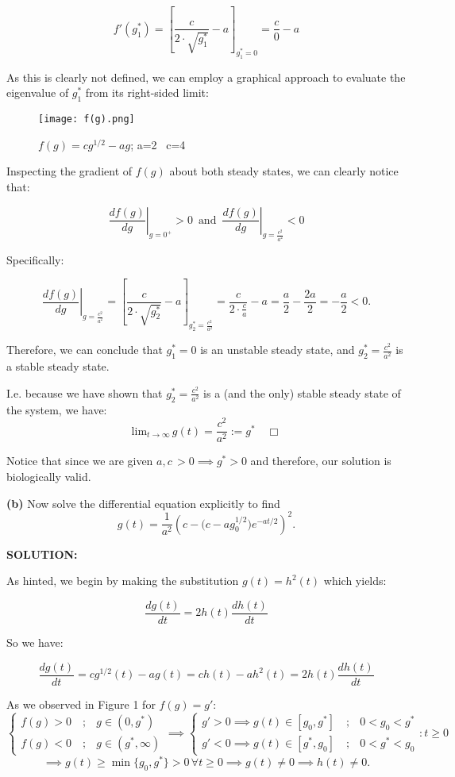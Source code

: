 \documentclass[]{article}
\begin{document}
\[
f'(g^*_1) = \left[{\frac{c}{2\cdot \sqrt{g^*_1}} - a}\right]_{g^*_1 = 0} = \frac{c}{0} - a
\]

As this is clearly not defined, we can employ a graphical approach to evaluate \indent the eigenvalue of $g^*_1$ from its right-sided limit:

\begin{figure}[H]
    \centering
    \texttt{[image: f(g).png]}
    \caption{$f(g) =c g^{1/2} - a g  $; a=2 \, c=4}
    \label{fig:f(g)}
\end{figure}
Inspecting the gradient of $f(g)$ about both steady states, we can clearly \indent notice that:

\[
\left. \frac{df(g)}{dg} \right|_{g=0^{+}} > 0 \, \text{ and } \, \left. \frac{df(g)}{dg} \right|_{g=\frac{c^2}{a^2}} < 0
\]

Specifically:

\[
\left. \frac{df(g)}{dg} \right|_{g=\frac{c^2}{a^2}} = \left[{\frac{c}{2\cdot \sqrt{g^*_2}} - a}\right]_{g^*_2 = \frac{c^2}{a^2}} = \frac{c}{2 \cdot \frac{c}{a} } - a = \frac{a}{2} -\frac{2a}{2} = - \frac{a}{2}  < 0.
\]

Therefore, we can conclude that $g^*_1 = 0$ is an unstable steady state, and \indent $g^*_2 = \frac{c^2}{a^2}$ is a stable steady state.\newline

I.e. because we have shown that $g^*_2 = \frac{c^2}{a^2}$ is a (and the only) stable steady \indent state of the system, we have:
\[
\text{lim}_{t\to \infty}\, g(t) = \frac{c^2}{a^2} := g^* \quad \Box
\]

Notice that since we are given $a, c \, > 0 \implies g^* > 0$ and therefore, our \indent solution is biologically valid. \newline

\noindent \textbf{(b)} Now solve the differential equation explicitly to find
\[
g(t) = \frac{1}{a^2} \left( c - \big(c - a g_0^{1/2}\big) e^{-at/2} \right)^2.
\]

\noindent \textbf{SOLUTION:}\newline

As hinted, we begin by making the substitution $g(t) = h^2(t)$ which yields:

\[
\frac{dg(t)}{dt} = 2h(t)\frac{dh(t)}{dt}
\]

So we have:

\[
\frac{dg(t)}{dt} =  c g^{1/2}(t) - a g(t) = c h(t) -ah^2(t) = 2h(t)\frac{dh(t)}{dt}
\]

As we observed in Figure 1 for $f(g) = g'$:
\[
\begin{cases}
    f(g) > 0 \quad ;&g\in(0,g^*)\\
    f(g) < 0  \quad ;& g \in (g^*,\infty)
\end{cases} \implies  \begin{cases}
    g' > 0 \implies g(t) \in [g_0,g^*] \quad ;& 0<g_0 < g^* \\
    g ' < 0 \implies g(t) \in [g^* , g_0] \quad ;& 0<g^*<g_0
\end{cases}: t\geq 0 \]
\[\implies g(t) \geq \min\{g_0,g^*\} > 0 \, \forall t \geq 0  \implies g(t) \neq 0 \implies h(t) \neq 0.
\]
\end{document}
